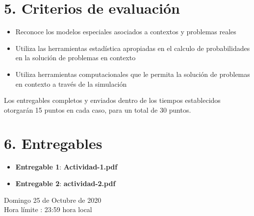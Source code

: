 \documentclass[base=hide,11pt]{elegantbook}
\begin{document}
\section*{5. Criterios de evaluación}

\begin{itemize}
	\item Reconoce los modelos especiales asociados a contextos  y problemas reales
	\item Utiliza las herramientas estadística apropiadas en el calculo de probabilidades en la solución de problemas en contexto
	\item Utiliza herramientas computacionales que le permita  la solución de problemas en contexto a través de la simulación
\end{itemize}

Los entregables completos y enviados dentro de los tiempos establecidos  otorgarán 15 puntos en cada caso, para un  total de 30 puntos. 



\section*{6. Entregables}

\begin{itemize}
	\item {\bf Entregable 1}:   \textcolor{col4}{\bf Actividad-1.pdf } 
	\item {\bf Entregable 2}:   \textcolor{col4}{\bf actividad-2.pdf } 
\end{itemize}
\vspace{1cm}

Domingo 25 de Octubre de 2020\\
Hora límite : 23:59  hora  local\\


\end{document}

